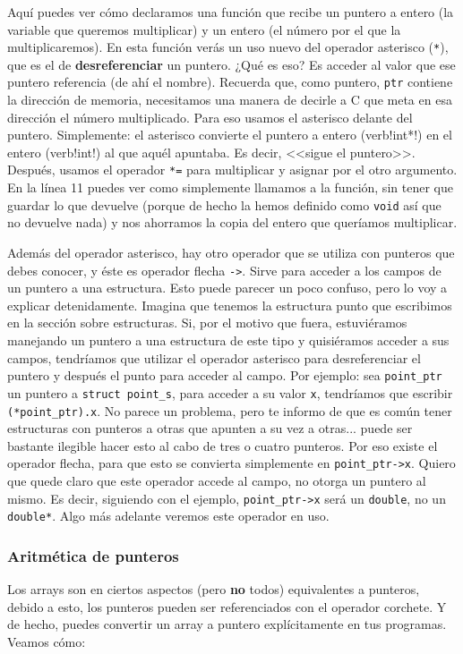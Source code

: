 \documentclass[a4paper]{article}
\begin{document}
Aquí puedes ver cómo declaramos una función que recibe un puntero a entero (la
variable que queremos multiplicar) y un entero (el número por el que la
multiplicaremos). En esta función verás un uso nuevo del operador asterisco
(\verb!*!), que es el de \textbf{desreferenciar} un puntero. ¿Qué es eso?
Es acceder al valor que ese puntero referencia (de ahí el nombre). Recuerda
que, como puntero, \verb!ptr! contiene la dirección de memoria, necesitamos una
manera de decirle a C que meta en esa dirección el número multiplicado. Para eso
usamos el asterisco delante del puntero. Simplemente: el asterisco convierte
el puntero a entero (verb!int*!) en el entero (verb!int!) al que aquél apuntaba.
Es decir, <<sigue el puntero>>. Después, usamos el operador \verb!*=!
para multiplicar y asignar por el otro argumento.
En la línea 11 puedes ver como simplemente llamamos a la función, sin tener
que guardar lo que devuelve (porque de hecho la hemos definido como \verb!void!
así que no devuelve nada) y nos ahorramos la copia del entero que queríamos
multiplicar.

Además del operador asterisco, hay otro operador que se utiliza con punteros
que debes conocer, y éste es operador flecha \verb|->|. Sirve para acceder a los
campos de un puntero a una estructura. Esto puede parecer un poco confuso, pero
lo voy a explicar detenidamente. Imagina que tenemos la estructura punto que
escribimos en la sección sobre estructuras. Si, por el motivo que fuera,
estuviéramos
manejando un puntero a una estructura de este tipo y quisiéramos acceder a sus
campos,
tendríamos que utilizar el operador asterisco para desreferenciar el puntero
y después el punto para acceder al campo. Por ejemplo: sea \verb!point_ptr! un
puntero a \verb!struct point_s!, para acceder a su valor \verb!x!, tendríamos
que escribir \verb!(*point_ptr).x!. No parece un problema, pero te informo de
que es común tener estructuras con punteros a otras que apunten a su vez a
otras... puede ser bastante ilegible hacer esto al cabo de tres o cuatro
punteros. Por eso existe el operador flecha, para que esto se convierta
simplemente en \verb|point_ptr->x|. Quiero que quede claro que este operador
accede al campo, no otorga un puntero al mismo. Es decir, siguiendo con el
ejemplo, \verb!point_ptr->x! será un \verb!double!, no un \verb!double*!.
Algo más adelante veremos este operador en uso.

\subsubsection{Aritmética de punteros}
Los arrays son en ciertos aspectos (pero \textbf{no} todos) equivalentes a
punteros, debido a esto, los punteros pueden ser referenciados con el operador
corchete. Y de hecho, puedes convertir un array a puntero explícitamente en
tus programas. Veamos cómo:
\end{document}
